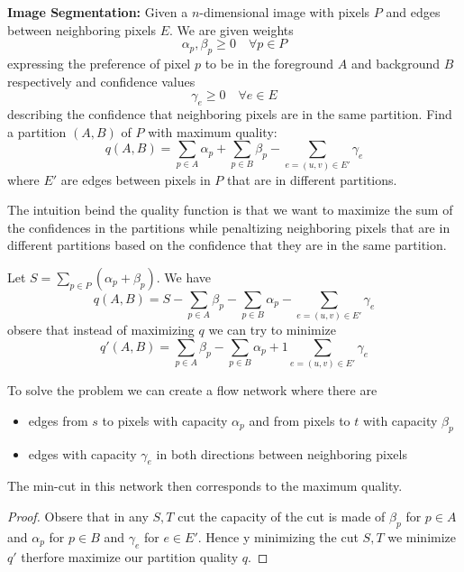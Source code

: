 \begin{definition}
	\textbf{Image Segmentation: } Given a $n$-dimensional image with pixels $P$ and edges between neighboring pixels $E$. We are given weights
	$$\alpha_p, \beta_p \geq 0 \quad \forall p \in P$$
	expressing the preference of pixel $p$ to be in the foreground $A$ and background $B$ respectively and confidence values
	$$\gamma_e \geq 0 \quad \forall e \in E$$
	describing the confidence that neighboring pixels are in the same partition. Find a partition $(A,B)$ of $P$ with maximum quality:
	$$q(A,B) = \sum_{p \in A} \alpha_p + \sum_{p \in B} \beta_p - \sum_{e=(u,v) \in E'} \gamma_e $$
	where $E'$ are edges between pixels in $P$ that are in different partitions.
\end{definition}

\begin{remark}
	The intuition beind the quality function is that we want to maximize the sum of the confidences in the partitions while penaltizing neighboring pixels that are in different partitions based on the confidence that they are in the same partition.
\end{remark}

\begin{lemma}
	Let $S = \sum_{p \in P} (\alpha_p + \beta_p)$. We have
	$$q(A,B) = S - \sum_{p \in A} \beta_p - \sum_{p \in B} \alpha_p - \sum_{e=(u,v) \in E'} \gamma_e$$
	obsere that instead of maximizing $q$ we can try to minimize
	$$q'(A,B) = \sum_{p \in A} \beta_p - \sum_{p \in B} \alpha_p +1 \sum_{e=(u,v) \in E'} \gamma_e$$
\end{lemma}

\begin{theorem}
	To solve the problem we can create a flow network where there are
	\begin{itemize}
		\item edges from $s$ to pixels with capacity $\alpha_p$ and from pixels to $t$ with capacity $\beta_p$
		\item edges with capacity $\gamma_e$ in both directions between neighboring pixels
	\end{itemize}
	The min-cut in this network then corresponds to the maximum quality.
\end{theorem}

\begin{proof}
	Obsere that in any $S, T$ cut the capacity of the cut is made of $\beta_p$ for $p \in A$ and $\alpha_p$ for $p \in B$ and $\gamma_e$ for $e \in E'$. Hence y minimizing the cut $S, T$ we minimize $q'$ therfore maximize our partition quality $q$.
\end{proof}